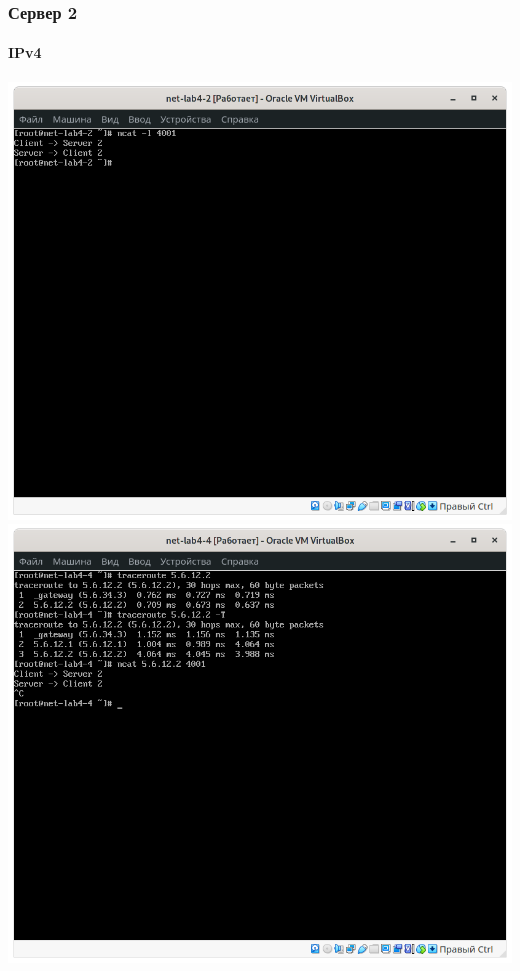 \subsubsection{Сервер 2}
\paragraph{IPv4}
\begin{center}
    \includegraphics[width=.49\textwidth]{screenshots/var2-ncat2-server-ipv4}
    \includegraphics[width=.49\textwidth]{screenshots/var2-ncat2-client-ipv4}
\end{center}

